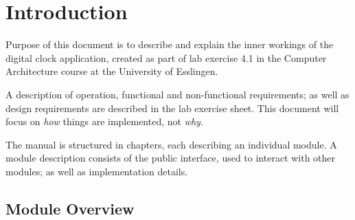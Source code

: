\chapter{Introduction}

Purpose of this document is to describe and explain the inner workings of the digital clock application, created as part of lab exercise 4.1 in the Computer Architecture course at the University of Esslingen.

A description of operation, functional and non-functional requirements; as well as design requirements are described in the lab exercise sheet. This document will focus on \emph{how} things are implemented, not \emph{why}.

The manual is structured in chapters, each describing an individual module. A module description consists of the public interface, used to interact with other modules; as well as implementation details.

\section{Module Overview}\label{sec:module_overview}

